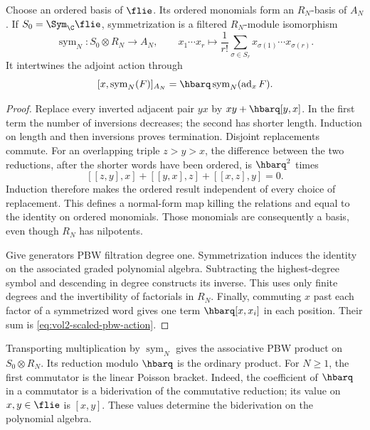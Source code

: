 \begin{proposition}\label{prop:vol2-rees-pbw}
Choose an ordered basis of $\flie$. Its ordered monomials form an
$R_N$-basis of $A_N$. If $S_0=\Sym_\C\flie$, symmetrization is a
filtered $R_N$-module isomorphism
\[
 \operatorname{sym}_N:S_0\otimes R_N\longrightarrow A_N,
 \qquad x_1\cdots x_r\longmapsto
 \frac1{r!}\sum_{\sigma\in S_r}x_{\sigma(1)}\cdots x_{\sigma(r)}.
\]
It intertwines the adjoint action through
\begin{equation}\label{eq:vol2-scaled-pbw-action}
 [x,\operatorname{sym}_N(F)]_{A_N}
 =\hbarq\operatorname{sym}_N(\operatorname{ad}_xF).
\end{equation}
\end{proposition}

\begin{proof}
Replace every inverted adjacent pair $yx$ by
$xy+\hbarq[y,x]$. In the first term the number of inversions
decreases; the second has shorter length. Induction on length and
then inversions proves termination. Disjoint replacements commute.
For an overlapping triple $z>y>x$, the difference between the two
reductions, after the shorter words have been ordered, is
$\hbarq^2$ times
\[
 [[z,y],x]+[[y,x],z]+[[x,z],y]=0.
\]
Induction therefore makes the ordered result independent of every
choice of replacement. This defines a normal-form map killing the
relations and equal to the identity on ordered monomials. Those
monomials are consequently a basis, even though $R_N$ has nilpotents.

Give generators PBW filtration degree one. Symmetrization induces
the identity on the associated graded polynomial algebra. Subtracting
the highest-degree symbol and descending in degree constructs its
inverse. This uses only finite degrees and the invertibility of
factorials in $R_N$. Finally, commuting $x$ past each factor of a
symmetrized word gives one term $\hbarq[x,x_i]$ in each position.
Their sum is \eqref{eq:vol2-scaled-pbw-action}.
\end{proof}

Transporting multiplication by $\operatorname{sym}_N$ gives the
associative PBW product on $S_0\otimes R_N$. Its reduction modulo
$\hbarq$ is the ordinary product. For $N\geq1$, the first commutator
is the linear Poisson bracket. Indeed, the coefficient of $\hbarq$ in a
commutator is a biderivation of the commutative reduction; its value
on $x,y\in\flie$ is $[x,y]$. These values determine the biderivation
on the polynomial algebra.

